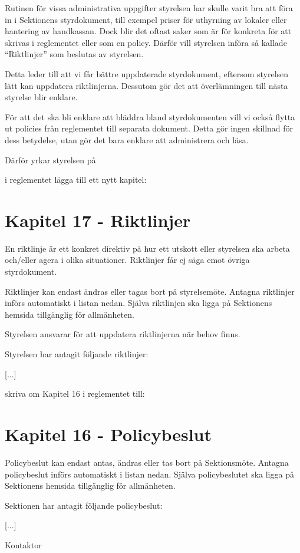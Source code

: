 \documentclass[../_main/handlingar.tex]{subfiles}
\begin{document}

Rutinen för vissa administrativa uppgifter styrelsen har skulle varit bra att föra in i Sektionens styrdokument, till exempel priser för uthyrning av lokaler eller hantering av handkassan. Dock blir det oftast saker som är för konkreta för att skrivas i reglementet eller som en policy. Därför vill styrelsen införa så kallade ``Riktlinjer'' som beslutas av styrelsen.

Detta leder till att vi får bättre uppdaterade styrdokument, eftersom styrelsen lätt kan uppdatera riktlinjerna. Dessutom gör det att överlämningen till nästa styrelse blir enklare.

För att det ska bli enklare att bläddra bland styrdokumenten vill vi också flytta ut policies från reglementet till separata dokument. Detta gör ingen skillnad för dess betydelse, utan gör det bara enklare att administrera och läsa.

Därför yrkar styrelsen på
\begin{attsatser}
    \att i reglementet lägga till ett nytt kapitel:\par
    {\it
    \vspace*{-\baselineskip}
    \section*{Kapitel 17 - Riktlinjer}
    En riktlinje är ett konkret direktiv på hur ett utskott eller styrelsen ska arbeta och/eller agera i olika situationer. Riktlinjer får ej säga emot övriga styrdokument.

    Riktlinjer kan endast ändras eller tagas bort på styrelsemöte. Antagna riktlinjer införs automatiskt i listan nedan. Själva riktlinjen ska ligga på Sektionens hemsida tillgänglig för allmänheten.

    Styrelsen ansvarar för att uppdatera riktlinjerna när behov finns.

    Styrelsen har antagit följande riktlinjer:
    \begin{dashlist}
        \item {[...]}
    \end{dashlist}
    }
    \att skriva om Kapitel 16 i reglementet till:\par
    {\it
    \vspace*{-\baselineskip}
    \section*{Kapitel 16 - Policybeslut}
    Policybeslut kan endast antas, ändras eller tas bort på Sektionsmöte. Antagna policybeslut införs automatiskt i listan nedan. Själva policybeslutet ska ligga på Sektionens hemsida tillgänglig för allmänheten.

    Sektionen har antagit följande policybeslut:
    \begin{dashlist}
        \item {[...]}
    \end{dashlist}
    }
\end{attsatser}

\begin{signatures}{1}
    \ist
    \signature{Erik Månsson}{Kontaktor}
\end{signatures}
\end{document}
